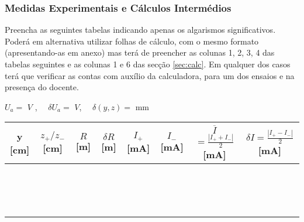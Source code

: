 \documentclass[a4paper,12pt]{article}  %
\begin{document}
\subsubsection{\sf Medidas Experimentais e Cálculos Intermédios } \label{sec:dados}
Preencha as seguintes tabelas indicando  apenas os algarismos significativos. Poderá em alternativa utilizar folhas de cálculo, com o mesmo formato (apresentando-as em anexo) mas terá de preencher as colunas 1, 2, 3, 4 das tabelas seguintes e as colunas 1 e 6 das secção \ref{sec:calc}. Em qualquer dos casos terá que verificar as contas com auxílio da calculadora, para um dos ensaios e na presença do docente.

\begin{center}
	\noindent	$U_a =$ \underline{\makebox[1.5cm][r]{~}} $V$ ,  $\quad \delta U_a=$	\underline{\makebox[1cm][r]{~}} $V$, $\quad \delta (y,z)=$ \underline{\makebox[1cm][r]{~}} mm  \\

	\renewcommand{\arraystretch}{0.75}
	\begin{tabular}{|c|c|c|c|c|c|c|c|}
	\hline
	y [cm]  & $z_+/z_-$ [cm]  & $R$ [m] & $\delta R$ [m] & $I_+$ [mA] & $I_-$ [mA] & $\overline{I}$   {\tiny $ = \frac{| I_+ + I_-|}{2}$ [mA] } & {\tiny $\delta I = \frac{| I_+ - I_-|}{2}$ [mA] } \\
	\hline
	 &  &  &  & &  &  & \\ \cline{5-8}
	 &  &  &  & &  & & \\ \cline{5-8}
	 &  &  &  & &  & & \\ \cline{5-8}
	 \hline
	 &  &  &  & &  & & \\ \cline{5-8}
	 &  &  &  & &  & & \\ \cline{5-8}
	 &  &  &  & &  & & \\ \cline{5-8}
	 \hline
	 &  &  &  & &  & & \\ \cline{5-8}
	 &  &  &  & &  & & \\ \cline{5-8}
	 &  &  &  & &  & & \\ \cline{5-8}
	 \hline
	 &  &  &  & &  & & \\ \cline{5-8}
	 &  &  &  & &  & & \\ \cline{5-8}
	 &  &  &  & &  & & \\ \cline{5-8}
	 \hline
	 &  &  &  & &  & & \\ \cline{5-8}
	 &  &  &  & &  & & \\ \cline{5-8}
	 &  &  &  & &  & & \\ \cline{5-8}
	 \hline
 	\end{tabular}
	

\end{center}
\end{document}
